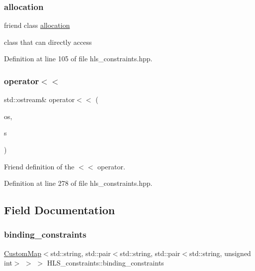 \subsubsection{\texorpdfstring{allocation}{allocation}}
{\footnotesize\ttfamily friend class \hyperlink{classallocation}{allocation}\hspace{0.3cm}{\ttfamily [friend]}}



class that can directly access 



Definition at line 105 of file hls\+\_\+constraints.\+hpp.

\mbox{\label{classHLS__constraints_ac1bdf2eca4693e1be98bf968682c065f}} 
\subsubsection{\texorpdfstring{operator$<$$<$}{operator<<}}
{\footnotesize\ttfamily std\+::ostream\& operator$<$$<$ (\begin{DoxyParamCaption}\item[{std\+::ostream \&}]{os,  }\item[{const \hyperlink{classHLS__constraints}{H\+L\+S\+\_\+constraints} \&}]{s }\end{DoxyParamCaption})\hspace{0.3cm}{\ttfamily [friend]}}



Friend definition of the $<$$<$ operator. 



Definition at line 278 of file hls\+\_\+constraints.\+hpp.



\subsection{Field Documentation}
\mbox{\label{classHLS__constraints_aa0ec5bd7ca34862b3786089e8360b63e}} 
\subsubsection{\texorpdfstring{binding\+\_\+constraints}{binding\_constraints}}
{\footnotesize\ttfamily \hyperlink{custom__map_8hpp_a18ca01763abbe3e5623223bfe5aaac6b}{Custom\+Map}$<$std\+::string, std\+::pair$<$std\+::string, std\+::pair$<$std\+::string, unsigned int$>$ $>$ $>$ H\+L\+S\+\_\+constraints\+::binding\+\_\+constraints\hspace{0.3cm}{\ttfamily [private]}}



